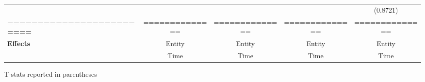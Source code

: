 \begin{center}
\begin{tabular}{lcccc}
\textbf{ }                         &                &                  &                  &     (0.8721)      \\
\textbf{=========================} & ============== &  ==============  &  ==============  &  ==============   \\
\textbf{Effects}                   &     Entity     &      Entity      &      Entity      &      Entity       \\
\textbf{}                          &      Time      &       Time       &       Time       &       Time        \\
\bottomrule
\end{tabular}
\end{center}

T-stats reported in parentheses